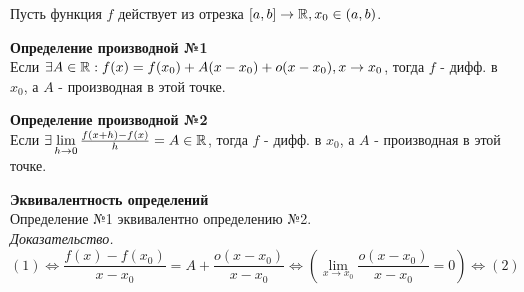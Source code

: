 Пусть функция $f$ действует из отрезка $[a, b] \rightarrow \operatorname*{\mathbb{R}}, x_0 \in (a, b)$.
 
\dotfill
 
\textbf{Определение производной №1} \\ 
Если $\exists A \in \operatorname*{\mathbb{R}}: f(x) = f(x_0) + A(x - x_0) + o(x - x_0), x \rightarrow x_0$, тогда $f$ - дифф. в $x_0$, а $A$ - производная в этой точке.
 
\dotfill 
 
\textbf{Определение производной №2} \\ 
Если $\exists \lim\limits_{h \to 0} \frac{f(x+h)-f(x)}{h} = A \in \operatorname*{\mathbb{R}}$, тогда $f$ - дифф. в $x_0$, а $A$ - производная в этой точке. 
 
\dotfill
 
\textbf{Эквивалентность определений} \\
Определение №1 эквивалентно определению №2. \\
 
\textit{Доказательство.} $$(1) \Leftrightarrow \frac{f(x) - f(x_0)}{x - x_0} = A + \frac{o(x-x_0)}{x-x_0} \Leftrightarrow 
(\lim\limits_{x \to x_0} \frac{o(x-x_0)}{x-x_0} = 0) \Leftrightarrow (2)$$
 
\dotfill
 
